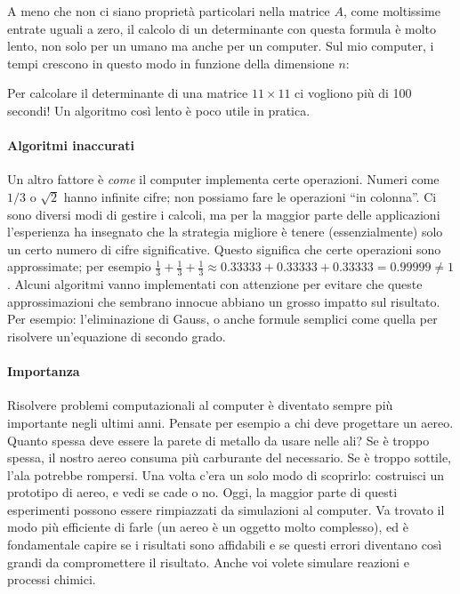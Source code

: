 \documentclass[a4paper]{report}
\theoremstyle{definiton}
\theoremstyle{remark}
\begin{document}
A meno che non ci siano proprietà particolari nella matrice $A$, come moltissime entrate uguali a zero, il calcolo di un determinante con questa formula è molto lento, non solo per un umano ma anche per un computer. Sul mio computer, i tempi crescono in questo modo in funzione della dimensione $n$:
\begin{center}
\end{center}
Per calcolare il determinante di una matrice $11\times 11$ ci vogliono più di 100 secondi! Un algoritmo così lento è poco utile in pratica.

\paragraph{Algoritmi inaccurati} Un altro fattore è \emph{come} il computer implementa certe operazioni. Numeri come $1/3$ o $\sqrt{2}$ hanno infinite cifre; non possiamo fare le operazioni ``in colonna''. Ci sono diversi modi di gestire i calcoli, ma per la maggior parte delle applicazioni l'esperienza ha insegnato che la strategia migliore è tenere (essenzialmente) solo un certo numero di cifre significative. Questo significa che certe operazioni sono approssimate; per esempio $\frac13 + \frac13 + \frac13 \approx 0.33333 + 0.33333 + 0.33333 = 0.99999 \neq 1$. Alcuni algoritmi vanno implementati con attenzione per evitare che queste approssimazioni che sembrano innocue abbiano un grosso impatto sul risultato. Per esempio: l'eliminazione di Gauss, o anche formule semplici come quella per risolvere un'equazione di secondo grado.

\paragraph{Importanza} Risolvere problemi computazionali al computer è diventato sempre più importante negli ultimi anni. Pensate per esempio a chi deve progettare un aereo. Quanto spessa deve essere la parete di metallo da usare nelle ali? Se è troppo spessa, il nostro aereo consuma più carburante del necessario. Se è troppo sottile, l'ala potrebbe rompersi. Una volta c'era un solo modo di scoprirlo: costruisci un prototipo di aereo, e vedi se cade o no. Oggi, la maggior parte di questi esperimenti possono essere rimpiazzati da simulazioni al computer. Va trovato il modo più efficiente di farle (un aereo è un oggetto molto complesso), ed è fondamentale capire se i risultati sono affidabili e se questi errori diventano così grandi da compromettere il risultato. Anche voi volete simulare reazioni e processi chimici.
\end{document}
